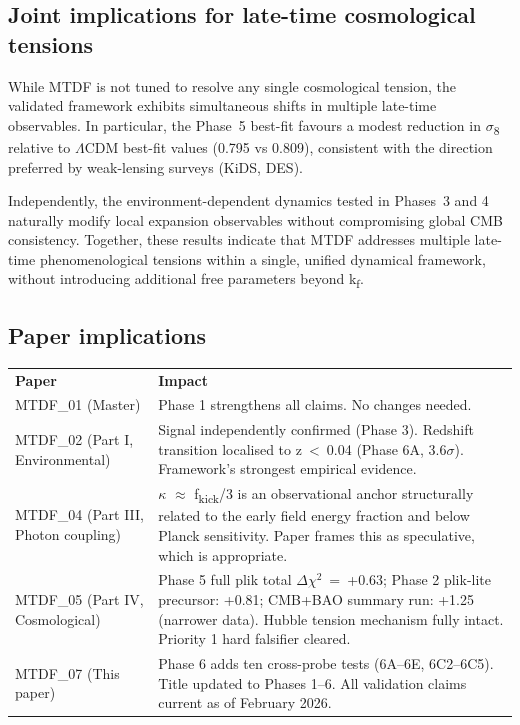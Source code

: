 \documentclass[11pt,a4paper]{article}
\begin{document}
\subsection{Joint implications for late-time cosmological tensions}
While MTDF is not tuned to resolve any single cosmological tension, the validated framework exhibits simultaneous shifts in multiple late-time observables. In particular, the Phase~5 best-fit favours a modest reduction in $\sigma$\textsubscript{8} relative to $\Lambda$CDM best-fit values (0.795 vs 0.809), consistent with the direction preferred by weak-lensing surveys (KiDS, DES).

Independently, the environment-dependent dynamics tested in Phases~3 and 4 naturally modify local expansion observables without compromising global CMB consistency. Together, these results indicate that MTDF addresses multiple late-time phenomenological tensions within a single, unified dynamical framework, without introducing additional free parameters beyond k\textsubscript{f}.

\subsection{Paper implications}
\begin{table}[H]
\centering
\footnotesize
\begin{tabularx}{\linewidth}{l>{\RaggedRight\arraybackslash}X}
\toprule
\textbf{Paper} & \textbf{Impact} \tabularnewline
MTDF\_\allowbreak{}01 (Master) & Phase 1 strengthens all claims. No changes needed. \tabularnewline
MTDF\_\allowbreak{}02 (Part I, Environmental) & Signal independently confirmed (Phase 3). Redshift transition localised to z~<~0.04 (Phase 6A, 3.6$\sigma$). Framework's strongest empirical evidence. \tabularnewline
MTDF\_\allowbreak{}04 (Part III, Photon coupling) & $\kappa$ $\approx$ f\textsubscript{kick}/3 is an observational anchor structurally related to the early field energy fraction and below Planck sensitivity. Paper frames this as speculative, which is appropriate. \tabularnewline
MTDF\_\allowbreak{}05 (Part IV, Cosmological) & Phase 5 full plik total $\Delta$$\chi$$^{2}$~=~+0.63; Phase 2 plik-lite precursor: +0.81; CMB+BAO summary run: +1.25 (narrower data). Hubble tension mechanism fully intact. Priority 1 hard falsifier cleared. \tabularnewline
MTDF\_\allowbreak{}07 (This paper) & Phase 6 adds ten cross-probe tests (6A--6E, 6C2--6C5). Title updated to Phases 1--6. All validation claims current as of February 2026. \tabularnewline
\bottomrule
\end{tabularx}
\end{table}
\end{document}
